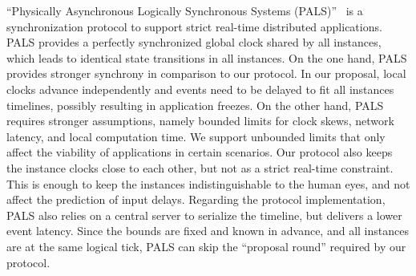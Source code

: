 \documentclass[sigplan,screen]{acmart}
\begin{document}
``Physically Asynchronous Logically Synchronous Systems (PALS)''~\cite{gals.pals}
is a synchronization protocol to support strict real-time distributed
applications.
PALS provides a perfectly synchronized global clock shared by all instances,
which leads to identical state transitions in all instances.
%
On the one hand, PALS provides stronger synchrony in comparison to our
protocol.
In our proposal, local clocks advance independently and events need to be
delayed to fit all instances timelines, possibly resulting in application
freezes.
%
On the other hand, PALS requires stronger assumptions, namely bounded limits
for clock skews, network latency, and local computation time.
We support unbounded limits that only affect the viability of applications in
certain scenarios.
%
Our protocol also keeps the instance clocks close to each other, but not as a
strict real-time constraint.
This is enough to keep the instances indistinguishable to the human eyes, and
not affect the prediction of input delays.
%
Regarding the protocol implementation, PALS also relies on a central server to
serialize the timeline, but delivers a lower event latency.
Since the bounds are fixed and known in advance, and all instances are
at the same logical tick, PALS can skip the ``proposal round'' required by our
protocol.
\end{document}
